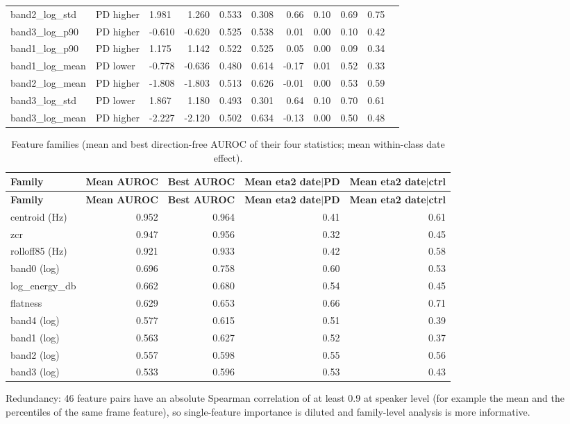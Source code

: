 \documentclass[10pt,a4paper]{article}
\begin{document}
\begin{center}
\begin{longtable}{lllrrrrrrrr}
band2\_log\_std & PD higher & 1.981 & 1.260 & 0.533 & 0.308 & 0.66 & 0.10 & 0.69 & 0.75\\
band3\_log\_p90 & PD higher & -0.610 & -0.620 & 0.525 & 0.538 & 0.01 & 0.00 & 0.10 & 0.42\\
band1\_log\_p90 & PD higher & 1.175 & 1.142 & 0.522 & 0.525 & 0.05 & 0.00 & 0.09 & 0.34\\
band1\_log\_mean & PD lower & -0.778 & -0.636 & 0.480 & 0.614 & -0.17 & 0.01 & 0.52 & 0.33\\
band2\_log\_mean & PD higher & -1.808 & -1.803 & 0.513 & 0.626 & -0.01 & 0.00 & 0.53 & 0.59\\
band3\_log\_std & PD lower & 1.867 & 1.180 & 0.493 & 0.301 & 0.64 & 0.10 & 0.70 & 0.61\\
band3\_log\_mean & PD higher & -2.227 & -2.120 & 0.502 & 0.634 & -0.13 & 0.00 & 0.50 & 0.48\\
\end{longtable}\end{center}
\begin{center}\scriptsize\renewcommand{\arraystretch}{1.12}
\begin{longtable}{lrrrr}
\caption{Feature families (mean and best direction-free AUROC of their four statistics; mean within-class date effect).}\\
\toprule
\textbf{Family} & \textbf{Mean AUROC} & \textbf{Best AUROC} & \textbf{Mean eta2 date$|$PD} & \textbf{Mean eta2 date$|$ctrl}\\\midrule\endfirsthead
\toprule
\textbf{Family} & \textbf{Mean AUROC} & \textbf{Best AUROC} & \textbf{Mean eta2 date$|$PD} & \textbf{Mean eta2 date$|$ctrl}\\\midrule\endhead
\bottomrule\endfoot
centroid (Hz) & 0.952 & 0.964 & 0.41 & 0.61\\
zcr & 0.947 & 0.956 & 0.32 & 0.45\\
rolloff85 (Hz) & 0.921 & 0.933 & 0.42 & 0.58\\
band0 (log) & 0.696 & 0.758 & 0.60 & 0.53\\
log\_energy\_db & 0.662 & 0.680 & 0.54 & 0.45\\
flatness & 0.629 & 0.653 & 0.66 & 0.71\\
band4 (log) & 0.577 & 0.615 & 0.51 & 0.39\\
band1 (log) & 0.563 & 0.627 & 0.52 & 0.37\\
band2 (log) & 0.557 & 0.598 & 0.55 & 0.56\\
band3 (log) & 0.533 & 0.596 & 0.53 & 0.43\\
\end{longtable}\end{center}
Redundancy: 46 feature pairs have an absolute Spearman correlation of at least 0.9 at speaker level (for example the mean and the percentiles of the same frame feature), so single-feature importance is diluted and family-level analysis is more informative.
\end{document}
